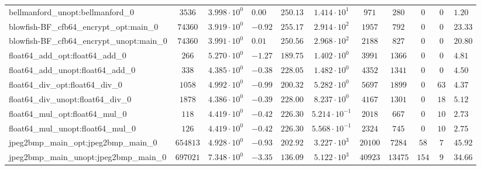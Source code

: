\begin{tabular}{|l|c|HHc|c|c|c|c|cH|}
bellmanford\_unopt:bellmanford\_0               & $ 3536     $ & $ 3.998 \cdot 10^{0} $ & $ 0.00  $ & $ 250.13 $ & $ 1.414 \cdot 10^{1}  $ & $ 971    $ & $ 280   $ & $ 0   $ & $ 0   $ & $ 1.20    $ \\
blowfish-BF\_cfb64\_encrypt\_opt:main\_0        & $ 74360    $ & $ 3.919 \cdot 10^{0} $ & $ -0.92 $ & $ 255.17 $ & $ 2.914 \cdot 10^{2}  $ & $ 1957   $ & $ 792   $ & $ 0   $ & $ 0   $ & $ 23.33   $ \\
blowfish-BF\_cfb64\_encrypt\_unopt:main\_0      & $ 74360    $ & $ 3.991 \cdot 10^{0} $ & $ 0.01  $ & $ 250.56 $ & $ 2.968 \cdot 10^{2}  $ & $ 2188   $ & $ 827   $ & $ 0   $ & $ 0   $ & $ 20.80   $ \\
float64\_add\_opt:float64\_add\_0               & $ 266      $ & $ 5.270 \cdot 10^{0} $ & $ -1.27 $ & $ 189.75 $ & $ 1.402 \cdot 10^{0}  $ & $ 3991   $ & $ 1366  $ & $ 0   $ & $ 0   $ & $ 4.81    $ \\
float64\_add\_unopt:float64\_add\_0             & $ 338      $ & $ 4.385 \cdot 10^{0} $ & $ -0.38 $ & $ 228.05 $ & $ 1.482 \cdot 10^{0}  $ & $ 4352   $ & $ 1341  $ & $ 0   $ & $ 0   $ & $ 4.50    $ \\
float64\_div\_opt:float64\_div\_0               & $ 1058     $ & $ 4.992 \cdot 10^{0} $ & $ -0.99 $ & $ 200.32 $ & $ 5.282 \cdot 10^{0}  $ & $ 5697   $ & $ 1899  $ & $ 0   $ & $ 63  $ & $ 4.37    $ \\
float64\_div\_unopt:float64\_div\_0             & $ 1878     $ & $ 4.386 \cdot 10^{0} $ & $ -0.39 $ & $ 228.00 $ & $ 8.237 \cdot 10^{0}  $ & $ 4167   $ & $ 1301  $ & $ 0   $ & $ 18  $ & $ 5.12    $ \\
float64\_mul\_opt:float64\_mul\_0               & $ 118      $ & $ 4.419 \cdot 10^{0} $ & $ -0.42 $ & $ 226.30 $ & $ 5.214 \cdot 10^{-1} $ & $ 2018   $ & $ 667   $ & $ 0   $ & $ 10  $ & $ 2.73    $ \\
float64\_mul\_unopt:float64\_mul\_0             & $ 126      $ & $ 4.419 \cdot 10^{0} $ & $ -0.42 $ & $ 226.30 $ & $ 5.568 \cdot 10^{-1} $ & $ 2324   $ & $ 745   $ & $ 0   $ & $ 10  $ & $ 2.75    $ \\
jpeg2bmp\_main\_opt:jpeg2bmp\_main\_0           & $ 654813   $ & $ 4.928 \cdot 10^{0} $ & $ -0.93 $ & $ 202.92 $ & $ 3.227 \cdot 10^{3}  $ & $ 20100  $ & $ 7284  $ & $ 58  $ & $ 7   $ & $ 45.92   $ \\
jpeg2bmp\_main\_unopt:jpeg2bmp\_main\_0         & $ 697021   $ & $ 7.348 \cdot 10^{0} $ & $ -3.35 $ & $ 136.09 $ & $ 5.122 \cdot 10^{3}  $ & $ 40923  $ & $ 13475 $ & $ 154 $ & $ 9   $ & $ 34.66   $ \\

\end{tabular}
